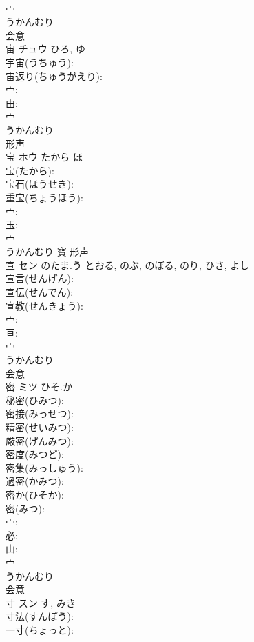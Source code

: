 \documentclass[8pt]{extreport}
\begin{document}
\begin{CJK}{UTF8}{min}
\\	宀	
\\	うかんむり	
\\	会意 
\\	宙	チュウ		ひろ, ゆ	
\\	宇宙(うちゅう): 
\\	宙返り(ちゅうがえり): 
\\	宀: 
\\	由: 
\\	宀	
\\	うかんむり	
\\	形声 
\\	宝	ホウ	たから	ほ	
\\	宝(たから): 
\\	宝石(ほうせき): 
\\	重宝(ちょうほう): 
\\	宀: 
\\	玉: 
\\	宀	
\\	うかんむり	寶	形声 
\\	宣	セン	のたま.う	とおる, のぶ, のぼる, のり, ひさ, よし	
\\	宣言(せんげん): 
\\	宣伝(せんでん): 
\\	宣教(せんきょう): 
\\	宀: 
\\	亘: 
\\	宀	
\\	うかんむり	
\\	会意 
\\	密	ミツ	ひそ.か		
\\	秘密(ひみつ): 
\\	密接(みっせつ): 
\\	精密(せいみつ): 
\\	厳密(げんみつ): 
\\	密度(みつど): 
\\	密集(みっしゅう): 
\\	過密(かみつ): 
\\	密か(ひそか): 
\\	密(みつ): 
\\	宀: 
\\	必: 
\\	山: 
\\	宀	
\\	うかんむり	
\\	会意 
\\	寸	スン		す, みき	
\\	寸法(すんぽう): 
\\	一寸(ちょっと): 

\end{CJK}
\end{document}
